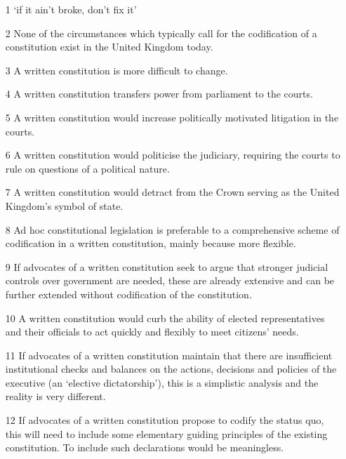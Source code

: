 \documentclass[14pt,titlepage]{extarticle}
\begin{document}
\begin{itemize}
  
\item[1]
 `if it ain't broke, don't fix it'
  
\item[2]
 None of the circumstances which typically call for the codification of a constitution exist in the United Kingdom today.
  
\item[3]
 A written constitution is more difficult to change.
  
\item[4]
 A written constitution transfers power from parliament to the courts.
  
\item[5]
 A written constitution would increase politically motivated litigation in the
 courts.
 
\item[6]
 A written constitution would politicise the judiciary, requiring the courts
 to rule on questions of a political nature.
  
\item[7]
 A written constitution would detract from the Crown serving as the United
Kingdom's symbol of state.
  
\item[8]
 Ad hoc constitutional legislation is preferable to a comprehensive scheme of
codification in a written constitution, mainly because more flexible.
  
\item[9]
 If advocates of a written constitution seek to argue that stronger judicial
controls over government are needed, these are already extensive and can be further extended without codification of the constitution.
  
\item[10]
 A written constitution would curb the ability of elected representatives and
their officials to act quickly and flexibly to meet citizens' needs.
  
\item[11]
 If advocates of a written constitution maintain that there are insufficient
institutional checks and balances on the actions, decisions and policies of the
executive (an `elective dictatorship'), this is a simplistic analysis and the reality is
very different.
  
\item[12]
 If advocates of a written constitution propose to codify the status quo, this
will need to include some elementary guiding principles of the existing constitution.
To include such declarations would be meaningless.
  

\end{itemize}
\end{document}

